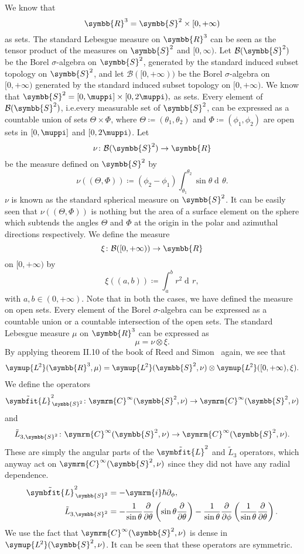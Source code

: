\documentclass[12pt, a4 paper]{article}
\let\symcal\mathcal
\theoremstyle{definition}
\newcommand{\ltwo}{\symup{L\kern-0.5pt^2}}
\newcommand{\rthree}{\symbb{R}^3}
\newcommand{\rr}{\symbb{R}}
\renewcommand{\i}{\symrm{i}}
\renewcommand{\pi}{\muppi}
\newcommand{\lvecsquare}{\tilde{\symbfit{L}}^2}
\newcommand{\der}{\operatorname{d\!}{}}
\begin{document}
    We know that \[\rthree = \symbb{S}^2 \times [0, +\infty)\] as sets. The standard Lebesgue measure on $\rthree$ can be seen as the tensor product of the measures on $\symbb{S}^2$ and $[0, \infty)$. Let $\symcal{B}(\symbb{S}^2)$ be the Borel $\sigma$-algebra on $\symbb{S}^2$, generated by the standard induced subset topology on $\symbb{S}^2$, and let $\symcal{B}([0,+\infty))$ be the Borel $\sigma$-algebra on $[0, +\infty)$ generated by the standard induced subset topology on $[0, +\infty)$. We know that $\symbb{S}^2 = [0, \pi] \times [0, 2\pi),$ as sets. Every element of $\symcal{B}(\symbb{S}^2)$, i.e.\@ every measurable set of $\symbb{S}^2$, can be expressed as a countable union of sets $\Theta \times \Phi$, where $\Theta \coloneq (\theta_1, \theta_2)$ and $\Phi \coloneq (\phi_1, \phi_2)$ are open sets in $[0, \pi]$ and $[0, 2\pi)$. Let
    \[
        \nu \colon \symcal{B}(\symbb{S}^2) \rightarrow \rr
    \]
    be the measure defined on $\symbb{S}^2$ by
    \[
        \nu((\Theta, \Phi)) \coloneq (\phi_2 - \phi_1) \int_{\theta_1}^{\theta_2}\sin{\theta}\der \theta.
    \]
    $\nu$ is known as the standard spherical measure on $\symbb{S}^2$. It can be easily seen that $\nu((\Theta, \Phi))$ is nothing but the area of a surface element on the sphere which subtends the angles $\Theta$ and $\Phi$ at the origin in the polar and azimuthal directions respectively. We define the measure
    \[
        \xi \colon \symcal{B}([0, +\infty)) \rightarrow \rr
    \]
    on $[0, +\infty)$ by
    \[
        \xi((a, b)) \coloneq \int_a^b r^2\! \der r,
    \]
    with $a, b \in (0, +\infty)$. Note that in both the cases, we have defined the measure on open sets. Every element of the Borel $\sigma$-algebra can be expressed as a countable union or a countable intersection of the open sets. The standard Lebesgue measure $\mu$ on $\rthree$ can be expressed as
    \[
        \mu = \nu \otimes \xi.
    \]
    By applying theorem II.10 of the book of Reed and Simon~\cite[p.~52]{Reed} again, we see that
    \begin{align}
        \ltwo(\rthree, \mu) = \ltwo(\symbb{S}^2, \nu) \otimes \ltwo([0, +\infty), \xi).
    \end{align}
    We define the operators \[\lvecsquare_{\,\symbb{S}^2} \colon \symrm{C}^\infty(\symbb{S}^2, \nu) \rightarrow \symrm{C}^\infty(\symbb{S}^2, \nu)\] and \[\tilde{L}_{3, \symbb{S}^2} \colon \symrm{C}^\infty(\symbb{S}^2, \nu) \rightarrow \symrm{C}^\infty(\symbb{S}^2, \nu).\] These are simply the angular parts of the $\lvecsquare$ and $\tilde{L}_3$ operators, which anyway act on $\symrm{C}^\infty(\symbb{S}^2, \nu)$ since they did not have any radial dependence.
    \begin{align*}
        \lvecsquare_{\,\symbb{S}^2} &= -\i\hbar\partial_\phi,\\
        \tilde{L}_{3, \symbb{S}^2}  &= -\frac{1}{\sin{\theta}}\frac{\partial}{\partial \theta}\left(\sin{\theta}\frac{\partial}{\partial\theta}\right) -\frac{1}{\sin{\theta}}\frac{\partial}{\partial\phi}\left(\frac{1}{\sin{\theta}}\frac{\partial}{\partial\theta}\right).
    \end{align*}
    We use the fact that $\symrm{C}^\infty(\symbb{S}^2, \nu)$ is dense in $\ltwo(\symbb{S}^2, \nu)$. It can be seen that these operators are symmetric.
\end{document}
